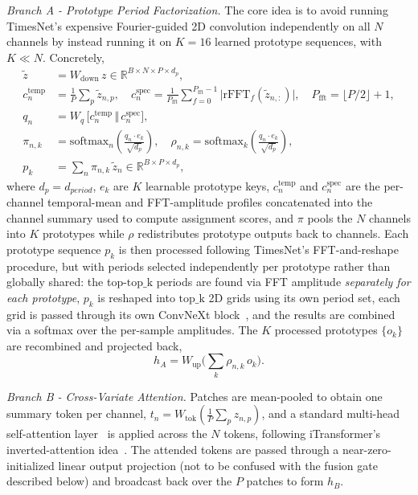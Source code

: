 \documentclass[10pt,journal]{IEEEtran}
\begin{document}
\emph{Branch A - Prototype Period Factorization.} The core idea is to avoid running TimesNet's expensive Fourier-guided 2D convolution independently on all $N$ channels by instead running it on $K\!=\!16$ learned prototype sequences, with $K\ll N$. Concretely,
\begin{align}
\tilde{z} &= W_{\mathrm{down}}\,z \in \mathbb{R}^{B\times N\times P\times d_p}, \\
c_n^{\mathrm{temp}} &= \tfrac{1}{P}\textstyle\sum_p \tilde{z}_{n,p}, \quad
c_n^{\mathrm{spec}} = \tfrac{1}{P_{\mathrm{fft}}}\textstyle\sum_{f=0}^{P_{\mathrm{fft}}-1} \big|\mathrm{rFFT}_f(\tilde{z}_{n,:})\big|, \quad P_{\mathrm{fft}} = \lfloor P/2 \rfloor + 1, \\
q_n &= W_q\,\big[c_n^{\mathrm{temp}} \,\Vert\, c_n^{\mathrm{spec}}\big], \\
\pi_{n,k} &= \mathrm{softmax}_n\!\left(\tfrac{q_n \cdot e_k}{\sqrt{d_p}}\right), \quad
\rho_{n,k} = \mathrm{softmax}_k\!\left(\tfrac{q_n \cdot e_k}{\sqrt{d_p}}\right), \\
p_k &= \textstyle\sum_n \pi_{n,k}\, \tilde{z}_n \in \mathbb{R}^{B \times P\times d_p},
\end{align}
where $d_p=d_{period}$, $e_k$ are $K$ learnable prototype keys, $c_n^{\mathrm{temp}}$ and $c_n^{\mathrm{spec}}$ are the per-channel temporal-mean and FFT-amplitude profiles concatenated into the channel summary used to compute assignment scores, and $\pi$ pools the $N$ channels into $K$ prototypes while $\rho$ redistributes prototype outputs back to channels. Each prototype sequence $p_k$ is then processed following TimesNet's FFT-and-reshape procedure, but with periods selected independently per prototype rather than globally shared: the top-$\mathrm{top\_k}$ periods are found via FFT amplitude \emph{separately for each prototype}, $p_k$ is reshaped into $\mathrm{top\_k}$ 2D grids using its own period set, each grid is passed through its own ConvNeXt block~\cite{convnext}, and the results are combined via a softmax over the per-sample amplitudes. The $K$ processed prototypes $\{o_k\}$ are recombined and projected back,
\begin{equation}
h_A = W_{\mathrm{up}} \Big(\textstyle\sum_k \rho_{n,k}\, o_k\Big).
\end{equation}

\emph{Branch B - Cross-Variate Attention.} Patches are mean-pooled to obtain one summary token per channel, $t_n = W_{\mathrm{tok}}\left (\tfrac1P\sum_p z_{n,p}\right )$, and a standard multi-head self-attention layer~\cite{attention} is applied across the $N$ tokens, following iTransformer's inverted-attention idea~\cite{itransformer}. The attended tokens are passed through a near-zero-initialized linear output projection (not to be confused with the fusion gate described below) and broadcast back over the $P$ patches to form $h_B$.
\end{document}
